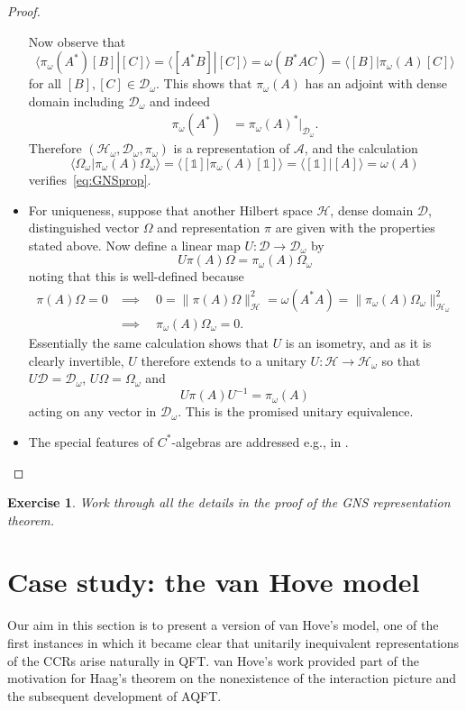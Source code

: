 \documentclass[12pt]{article}
\newcommand{\1}{\mathds{1}}                         %
\newcommand{\HH}{{\mathcal{H}}}
\newcommand{\DD}{{\mathscr{D}}}
\newcommand{\II}{{\mathbb{1}}}
\newcommand{\Ac}{{\mathcal{A}}}
\newcommand{\ip}[2]{\langle #1|#2\rangle}
\newtheorem{exercise}[theorem]{Exercise}
\begin{document}
\begin{proof}
\begin{itemize}
		Now observe that 
		\[
		\ip{\pi_\omega(A^*)[B]}{[C]} = \ip{[A^*B]}{[C]} =\omega(B^*AC) = \ip{[B]}{\pi_\omega(A)[C]}
		\] 
		for all $[B],[C]\in\DD_\omega$. This shows that $\pi_\omega(A)$ has an adjoint with dense domain including $\DD_\omega$ and indeed
		\begin{align*}
		\pi_\omega(A^*) &= \pi_\omega(A)^*|_{\DD_\omega}.
		\end{align*}
		Therefore $(\HH_\omega,\DD_\omega,\pi_\omega)$ is a representation of $\Ac$, and the calculation
		\[
		\ip{\Omega_\omega}{\pi_\omega(A)\Omega_\omega} = \ip{[\II]}{\pi_\omega(A)[\II]} = \ip{[\II]}{[A]}=\omega(A)
		\]
		verifies~\eqref{eq:GNSprop}. 
		\item For uniqueness, suppose that another Hilbert space $\HH$, dense domain $\DD$, distinguished vector $\Omega$ and representation $\pi$ are given with the properties stated above. Now define a linear map $U:\DD\to \DD_\omega$ by
		\[
		U\pi(A)\Omega = \pi_\omega(A)\Omega_\omega
		\]
		noting that this is well-defined because 
		\begin{align*}
		\pi(A)\Omega=0 & \implies \quad 0=\|\pi(A)\Omega\|_\HH^2=\omega(A^*A)=\|\pi_\omega(A)\Omega_\omega\|_{\HH_\omega}^2 \\
		&\implies\quad  \pi_\omega(A)\Omega_\omega = 0.
		\end{align*}
		Essentially the same calculation shows that $U$ is an isometry, and as it is clearly invertible, $U$ therefore extends to a unitary $U:\HH\to\HH_\omega$ so that $U\DD=\DD_\omega$, $U\Omega=\Omega_\omega$ and
		\[
		U\pi(A)U^{-1} = \pi_\omega(A)
		\]
		acting on any vector in $\DD_\omega$. This is the promised unitary equivalence.
		\item The special features of $C^*$-algebras are addressed e.g., in \cite[Prop.~2.3.3 and \S 2.3.3]{BratRob:vol1} .
	\end{itemize}
\end{proof}
\begin{exercise}
	Work through all the details in the proof of the GNS representation theorem.
\end{exercise}
	\section{Case study: the van Hove model}\label{sec:vH}
	
	Our aim in this section is to present a version of van Hove's model, one of the first instances in which it became clear that unitarily inequivalent representations of the CCRs arise naturally in QFT. van Hove's work provided part of the motivation for Haag's theorem on the nonexistence of the interaction picture and the subsequent development of AQFT.
	
\end{document}
